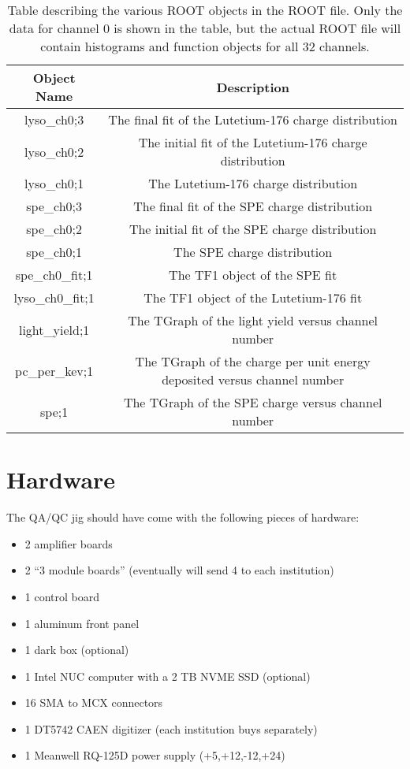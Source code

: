 \documentclass[12pt,openright,twoside]{report}
\begin{document}
\begin{table}
\centering
\begin{tabular}{c c}
Object Name & Description \\ \hline
lyso\_ch0;3 & The final fit of the Lutetium-176 charge distribution \\
lyso\_ch0;2 & The initial fit of the Lutetium-176 charge distribution \\
lyso\_ch0;1 & The Lutetium-176 charge distribution \\
spe\_ch0;3 & The final fit of the SPE charge distribution \\
spe\_ch0;2 & The initial fit of the SPE charge distribution \\
spe\_ch0;1 & The SPE charge distribution \\
spe\_ch0\_fit;1 & The TF1 object of the SPE fit \\
lyso\_ch0\_fit;1 & The TF1 object of the Lutetium-176 fit \\
light\_yield;1 & The TGraph of the light yield versus channel number \\
pc\_per\_kev;1 & The TGraph of the charge per unit energy deposited versus channel number \\
spe;1 & The TGraph of the SPE charge versus channel number \\
\end{tabular}
\caption{Table describing the various ROOT objects in the ROOT file. Only the data for channel 0 is shown in the table, but the actual ROOT file will contain histograms and function objects for all 32 channels.}
\label{table:root-file-description}
\end{table}

\chapter{Hardware}
The QA/QC jig should have come with the following pieces of hardware:

\begin{itemize}
\item 2 amplifier boards
\item 2 ``3 module boards'' (eventually will send 4 to each institution)
\item 1 control board
\item 1 aluminum front panel
\item 1 dark box (optional)
\item 1 Intel NUC computer with a 2 TB NVME SSD (optional)
\item 16 SMA to MCX connectors
\item 1 DT5742 CAEN digitizer (each institution buys separately)
\item 1 Meanwell RQ-125D power supply (+5,+12,-12,+24)
\end{itemize}
\end{document}

